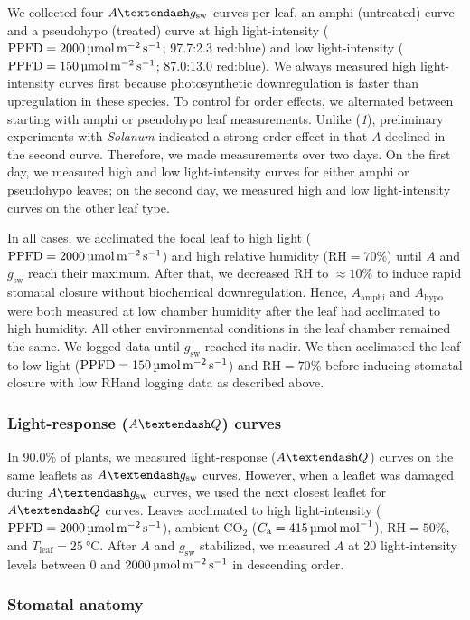 \documentclass[
  letterpaper,
  DIV=11,
  numbers=noendperiod]{scrartcl}
\newcommand{\Aamphi}{$A_{\mathrm{amphi}}$}
\newcommand{\Ahypo}{$A_{\mathrm{hypo}}$}
\newcommand{\agcurve}{$A \textendash g_\text{sw}$}
\newcommand{\aqcurve}{$A \textendash Q$}
\newcommand{\caequals}[1]{$C_\mathrm{a} = \qty{#1}{\micro\mol\raiseto{-1}\mol}$}
\newcommand{\gsw}{$g_\text{sw}$}
\newcommand{\ppfdequals}[1]{$\mathrm{PPFD} = \qty{#1}{\micro\mol\raiseto{-2}\meter\raiseto{-1}\second}$}
\newcommand{\rh}{$\mathrm{RH}$}
\newcommand{\rhequals}[1]{$\mathrm{RH} = #1\%$}
\newcommand{\tleafequals}[1]{$T_\mathrm{leaf} = \qty{#1}{\degreeCelsius}$}
\begin{document}
We collected four \agcurve{} curves per leaf, an amphi (untreated) curve
and a pseudohypo (treated) curve at high light-intensity
(\ppfdequals{2000}; 97.7:2.3 red:blue) and low light-intensity
(\ppfdequals{150}; 87.0:13.0 red:blue). We always measured high
light-intensity curves first because photosynthetic downregulation is
faster than upregulation in these species. To control for order effects,
we alternated between starting with amphi or pseudohypo leaf
measurements. Unlike (\emph{1}), preliminary experiments with
\emph{Solanum} indicated a strong order effect in that \(A\) declined in
the second curve. Therefore, we made measurements over two days. On the
first day, we measured high and low light-intensity curves for either
amphi or pseudohypo leaves; on the second day, we measured high and low
light-intensity curves on the other leaf type.

In all cases, we acclimated the focal leaf to high light
(\ppfdequals{2000}) and high relative humidity (\rhequals{70}) until
\(A\) and \gsw{} reach their maximum. After that, we decreased \rh{} to
\(\approx 10\%\) to induce rapid stomatal closure without biochemical
downregulation. Hence, \Aamphi{} and \Ahypo{} were both measured at low
chamber humidity after the leaf had acclimated to high humidity. All
other environmental conditions in the leaf chamber remained the same. We
logged data until \gsw{} reached its nadir. We then acclimated the leaf
to low light (\ppfdequals{150}) and \rhequals{70} before inducing
stomatal closure with low \rh and logging data as described above.

\subsubsection{\texorpdfstring{Light-response (\aqcurve)
curves}{Light-response () curves}}\label{light-response-curves}

In 90.0\% of plants, we measured light-response (\aqcurve) curves on the
same leaflets as \agcurve{} curves. However, when a leaflet was damaged
during \agcurve{} curves, we used the next closest leaflet for
\aqcurve{} curves. Leaves acclimated to high light-intensity
(\ppfdequals{2000}), ambient CO\(_2\) (\caequals{415}), \rhequals{50},
and \tleafequals{25}. After \(A\) and \gsw{} stabilized, we measured
\(A\) at 20 light-intensity levels between \(0\) and
\(\qty{2000}{\micro\mol\raiseto{-2}\meter\raiseto{-1}\second}\) in
descending order.

\subsubsection{Stomatal anatomy}\label{stomatal-anatomy}
\end{document}

